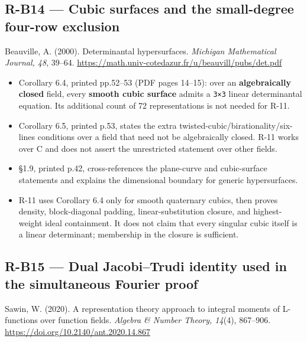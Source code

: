 \documentclass[11pt,a4paper]{article}
\providecommand{\tightlist}{\setlength{\itemsep}{0pt}\setlength{\parskip}{0pt}}
\theoremstyle{definition}\newtheorem{definition}{Definition}
\begin{document}
\subsection{R-B14 --- Cubic surfaces and the small-degree four-row
exclusion}\label{r-b14--cubic-surfaces-and-the-small-degree-four-row-exclusion}

Beauville, A. (2000). Determinantal hypersurfaces. \emph{Michigan
Mathematical Journal, 48}, 39--64.
\url{https://math.univ-cotedazur.fr/u/beauvill/pubs/det.pdf}

\begin{itemize}
\tightlist
\item
  Corollary 6.4, printed pp.52--53 (PDF pages 14--15): over an
  \textbf{algebraically closed} field, every \textbf{smooth cubic
  surface} admits a \nolinkurl{3×3} linear determinantal equation. Its
  additional count of 72 representations is not needed for R-11.
\item
  Corollary 6.5, printed p.53, states the extra
  twisted-cubic/birationality/six-lines conditions over a field that
  need not be algebraically closed. R-11 works over C and does not
  assert the unrestricted statement over other fields.
\item
  §1.9, printed p.42, cross-references the plane-curve and cubic-surface
  statements and explains the dimensional boundary for generic
  hypersurfaces.
\item
  R-11 uses Corollary 6.4 only for smooth quaternary cubics, then proves
  density, block-diagonal padding, linear-substitution closure, and
  highest-weight ideal containment. It does not claim that every
  singular cubic itself is a linear determinant; membership in the
  closure is sufficient.
\end{itemize}

\subsection{R-B15 --- Dual Jacobi--Trudi identity used in the
simultaneous Fourier
proof}\label{r-b15--dual-jacobitrudi-identity-used-in-the-simultaneous-fourier-proof}

Sawin, W. (2020). A representation theory approach to integral moments
of L-functions over function fields. \emph{Algebra \& Number Theory,
14}(4), 867--906. \url{https://doi.org/10.2140/ant.2020.14.867}
\end{document}
